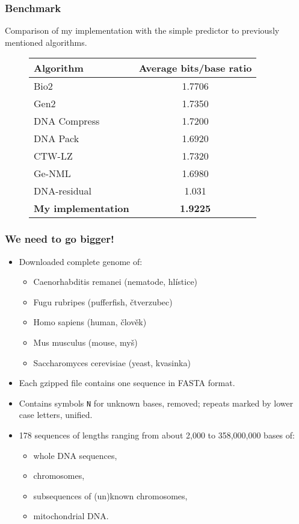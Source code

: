 \documentclass[hyperref={colorlinks=true}]{beamer}
\begin{document}
\begin{frame}
\frametitle{Benchmark}

Comparison of my implementation with the simple predictor to previously mentioned algorithms.

\begin{figure}
\centering
\begin{tabular}{|l||c|}
\hline
Algorithm & Average bits/base ratio \\ \hline
\hline
Bio2 & 1.7706 \\ \hline
Gen2 & 1.7350 \\ \hline
DNA Compress & 1.7200 \\ \hline
DNA Pack & 1.6920 \\ \hline
CTW-LZ & 1.7320 \\ \hline
Ge-NML & 1.6980 \\ \hline
\hline
DNA-residual & 1.031 \\ \hline
\hline
\textbf{My implementation} & \textbf{1.9225} \\ \hline
\end{tabular}
\end{figure}

\end{frame}

\begin{frame}[fragile]
\frametitle{We need to go bigger!}

\begin{itemize}
	\item Downloaded complete genome of:
		\begin{itemize}
			\item Caenorhabditis remanei (nematode, hlístice)
			\item Fugu rubripes (pufferfish, čtverzubec)
			\item Homo sapiens (human, člověk)
			\item Mus musculus (mouse, myš)
			\item Saccharomyces cerevisiae (yeast, kvasinka)
		\end{itemize}
	\item Each gzipped file contains one sequence in FASTA format.
	\item Contains symbols \verb|N| for unknown bases, removed; repeats marked by lower case letters, unified.
	\item 178 sequences of lengths ranging from about 2,000 to 358,000,000 bases of:
		\begin{itemize}
			\item whole DNA sequences,
			\item chromosomes,
			\item subsequences of (un)known chromosomes,
			\item mitochondrial DNA.
		\end{itemize}
\end{itemize}

\end{frame}
\end{document}
